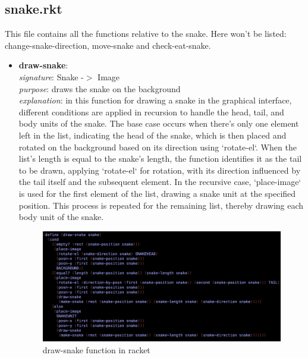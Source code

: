 \documentclass{article}
\begin{document}
	\subsection{snake.rkt}
	This file contains all the functions relative to the snake. 
	Here won't be listed: change-snake-direction, move-snake and check-eat-snake.
	\begin{itemize}
		\item \textbf{draw-snake}: \\
			\emph{signature}: Snake -$>$ Image \\
			\emph{purpose}: draws the snake on the background \\
			\emph{explanation}: in this function for drawing a snake in the graphical interface, different conditions are applied in recursion to handle the head, tail, and body units of the snake. The base case occurs when there's only one element left in the list, indicating the head of the snake, which is then placed and rotated on the background based on its direction using `rotate-el`. When the list's length is equal to the snake's length, the function identifies it as the tail to be drawn, applying `rotate-el` for rotation, with its direction influenced by the tail itself and the subsequent element. In the recursive case, `place-image` is used for the first element of the list, drawing a snake unit at the specified position. This process is repeated for the remaining list, thereby drawing each body unit of the snake.
			\begin{figure}[h!]
				\centering
				\includegraphics[width=.6\linewidth]{draw-snake.png}
				\caption{draw-snake function in racket}
			\end{figure}
	\end{itemize}
	
\end{document}
